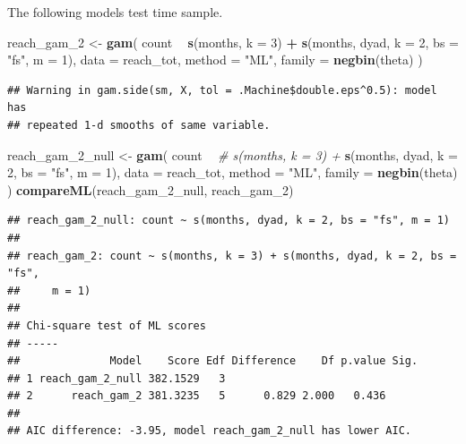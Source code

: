 \documentclass[]{article}
\newenvironment{Shaded}{\begin{snugshade}}{\end{snugshade}}
\newcommand{\CommentTok}[1]{\textcolor[rgb]{0.56,0.35,0.01}{\textit{#1}}}
\newcommand{\DataTypeTok}[1]{\textcolor[rgb]{0.13,0.29,0.53}{#1}}
\newcommand{\DecValTok}[1]{\textcolor[rgb]{0.00,0.00,0.81}{#1}}
\newcommand{\KeywordTok}[1]{\textcolor[rgb]{0.13,0.29,0.53}{\textbf{#1}}}
\newcommand{\NormalTok}[1]{#1}
\newcommand{\OperatorTok}[1]{\textcolor[rgb]{0.81,0.36,0.00}{\textbf{#1}}}
\newcommand{\StringTok}[1]{\textcolor[rgb]{0.31,0.60,0.02}{#1}}
\begin{document}
The following models test time sample.

\begin{Shaded}
\begin{Highlighting}[]
\NormalTok{reach_gam_}\DecValTok{2}\NormalTok{ <-}\StringTok{ }\KeywordTok{gam}\NormalTok{(}
\NormalTok{  count }\OperatorTok{~}
\StringTok{    }\KeywordTok{s}\NormalTok{(months, }\DataTypeTok{k =} \DecValTok{3}\NormalTok{) }\OperatorTok{+}
\StringTok{    }\KeywordTok{s}\NormalTok{(months, dyad, }\DataTypeTok{k =} \DecValTok{2}\NormalTok{, }\DataTypeTok{bs =} \StringTok{"fs"}\NormalTok{, }\DataTypeTok{m =} \DecValTok{1}\NormalTok{),}
  \DataTypeTok{data =}\NormalTok{ reach_tot,}
  \DataTypeTok{method =} \StringTok{"ML"}\NormalTok{,}
  \DataTypeTok{family =} \KeywordTok{negbin}\NormalTok{(theta)}
\NormalTok{)}
\end{Highlighting}
\end{Shaded}

\begin{verbatim}
## Warning in gam.side(sm, X, tol = .Machine$double.eps^0.5): model has
## repeated 1-d smooths of same variable.
\end{verbatim}

\begin{Shaded}
\begin{Highlighting}[]
\NormalTok{reach_gam_}\DecValTok{2}\NormalTok{_null <-}\StringTok{ }\KeywordTok{gam}\NormalTok{(}
\NormalTok{  count }\OperatorTok{~}
\StringTok{    }\CommentTok{# s(months, k = 3) +}
\StringTok{    }\KeywordTok{s}\NormalTok{(months, dyad, }\DataTypeTok{k =} \DecValTok{2}\NormalTok{, }\DataTypeTok{bs =} \StringTok{"fs"}\NormalTok{, }\DataTypeTok{m =} \DecValTok{1}\NormalTok{),}
  \DataTypeTok{data =}\NormalTok{ reach_tot,}
  \DataTypeTok{method =} \StringTok{"ML"}\NormalTok{,}
  \DataTypeTok{family =} \KeywordTok{negbin}\NormalTok{(theta)}
\NormalTok{)}
\KeywordTok{compareML}\NormalTok{(reach_gam_}\DecValTok{2}\NormalTok{_null, reach_gam_}\DecValTok{2}\NormalTok{)}
\end{Highlighting}
\end{Shaded}

\begin{verbatim}
## reach_gam_2_null: count ~ s(months, dyad, k = 2, bs = "fs", m = 1)
## 
## reach_gam_2: count ~ s(months, k = 3) + s(months, dyad, k = 2, bs = "fs", 
##     m = 1)
## 
## Chi-square test of ML scores
## -----
##              Model    Score Edf Difference    Df p.value Sig.
## 1 reach_gam_2_null 382.1529   3                              
## 2      reach_gam_2 381.3235   5      0.829 2.000   0.436     
## 
## AIC difference: -3.95, model reach_gam_2_null has lower AIC.
\end{verbatim}
\end{document}
